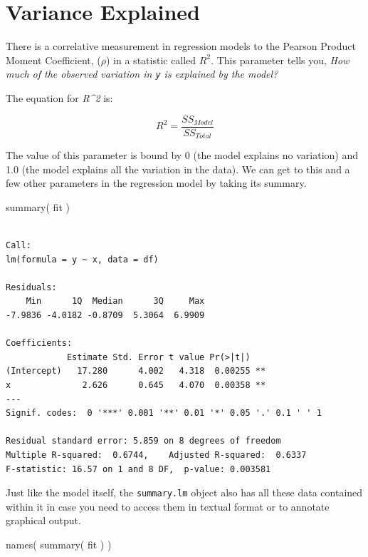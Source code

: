 \documentclass[
  letterpaper,
]{book}
\newenvironment{Shaded}{\begin{snugshade}}{\end{snugshade}}
\newcommand{\FunctionTok}[1]{\textcolor[rgb]{0.28,0.35,0.67}{#1}}
\newcommand{\NormalTok}[1]{\textcolor[rgb]{0.00,0.23,0.31}{#1}}
\begin{document}
\section{Variance Explained}\label{variance-explained}

There is a correlative measurement in regression models to the Pearson
Product Moment Coefficient, (\(\rho\)) in a statistic called \(R^2\).
This parameter tells you, \emph{How much of the observed variation in
\texttt{y} is explained by the model?}

The equation for \emph{R\^{}2} is:

\[
R^2 = \frac{SS_{Model}}{SS_{Total}}
\]

The value of this parameter is bound by 0 (the model explains no
variation) and 1.0 (the model explains all the variation in the data).
We can get to this and a few other parameters in the regression model by
taking its summary.

\begin{Shaded}
\begin{Highlighting}[]
\FunctionTok{summary}\NormalTok{( fit )}
\end{Highlighting}
\end{Shaded}

\begin{verbatim}

Call:
lm(formula = y ~ x, data = df)

Residuals:
    Min      1Q  Median      3Q     Max 
-7.9836 -4.0182 -0.8709  5.3064  6.9909 

Coefficients:
            Estimate Std. Error t value Pr(>|t|)   
(Intercept)   17.280      4.002   4.318  0.00255 **
x              2.626      0.645   4.070  0.00358 **
---
Signif. codes:  0 '***' 0.001 '**' 0.01 '*' 0.05 '.' 0.1 ' ' 1

Residual standard error: 5.859 on 8 degrees of freedom
Multiple R-squared:  0.6744,    Adjusted R-squared:  0.6337 
F-statistic: 16.57 on 1 and 8 DF,  p-value: 0.003581
\end{verbatim}

Just like the model itself, the \texttt{summary.lm} object also has all
these data contained within it in case you need to access them in
textual format or to annotate graphical output.

\begin{Shaded}
\begin{Highlighting}[]
\FunctionTok{names}\NormalTok{( }\FunctionTok{summary}\NormalTok{( fit ) )}
\end{Highlighting}
\end{Shaded}
\end{document}
